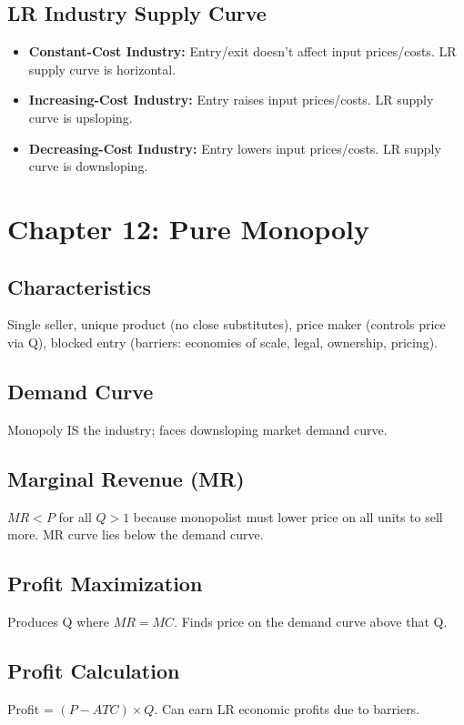 \documentclass{article}
\begin{document}
\subsection*{LR Industry Supply Curve}
\begin{itemize}
    \item \textbf{Constant-Cost Industry:} Entry/exit doesn't affect input prices/costs. LR supply curve is horizontal.
    \item \textbf{Increasing-Cost Industry:} Entry raises input prices/costs. LR supply curve is upsloping.
    \item \textbf{Decreasing-Cost Industry:} Entry lowers input prices/costs. LR supply curve is downsloping.
\end{itemize}

\section*{Chapter 12: Pure Monopoly}

\subsection*{Characteristics}
Single seller, unique product (no close substitutes), price maker (controls price via Q), blocked entry (barriers: economies of scale, legal, ownership, pricing).

\subsection*{Demand Curve}
Monopoly IS the industry; faces downsloping market demand curve.

\subsection*{Marginal Revenue (MR)}
$MR < P$ for all $Q > 1$ because monopolist must lower price on all units to sell more. MR curve lies below the demand curve.

\subsection*{Profit Maximization}
Produces Q where $MR=MC$. Finds price on the demand curve above that Q.

\subsection*{Profit Calculation}
Profit = $(P - ATC) \times Q$. Can earn LR economic profits due to barriers.
\end{document}
